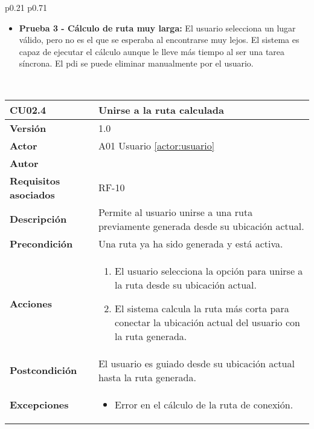 \begin{table}[H]
\begin{tabularx}{\linewidth}{ p{0.21\columnwidth} p{0.71\columnwidth} }
\begin{itemize}
			\vspace{2pt}
			\item \textbf{Prueba 3 - Cálculo de ruta muy larga:} El usuario selecciona un lugar válido, pero no es el que se esperaba al encontrarse muy lejos. El sistema es capaz de ejecutar el cálculo aunque le lleve más tiempo al ser una tarea síncrona. El \acrshort{pdi} se puede eliminar manualmente por el usuario.
		\end{itemize} \\
		\bottomrule
	\end{tabularx}
	\caption{CU02.3 Añadir \acrfull{pdi}}
	\label{cu:añadir-pdi}
\end{table}


\begin{table}[H]
	\centering
	\begin{tabularx}{\linewidth}{ p{} p{} }
		\toprule
		\textbf{CU02.4}    & \textbf{Unirse a la ruta calculada} \\
		\toprule
		\textbf{Versión}              & 1.0    \\
		\textbf{Actor}                & A01 Usuario \ref{actor:usuario} \\
		\textbf{Autor}                & \autor \\
		\textbf{Requisitos asociados} & RF-10 \\
		\textbf{Descripción}          & Permite al usuario unirse a una ruta previamente generada desde su ubicación actual. \\
		\textbf{Precondición}         & Una ruta ya ha sido generada y está activa. \\
		\textbf{Acciones}             &
		\begin{enumerate}
			\def\labelenumi{\arabic{enumi}.}
			\tightlist
			\item El usuario selecciona la opción para unirse a la ruta desde su ubicación actual.
			\item El sistema calcula la ruta más corta para conectar la ubicación actual del usuario con la ruta generada.
		\end{enumerate}\\
		\textbf{Postcondición}        & El usuario es guiado desde su ubicación actual hasta la ruta generada. \\
		\textbf{Excepciones}          & 
		\begin{itemize}
			\tightlist
			\item Error en el cálculo de la ruta de conexión.
		\end{itemize}\\

\end{tabularx}
\end{table}
